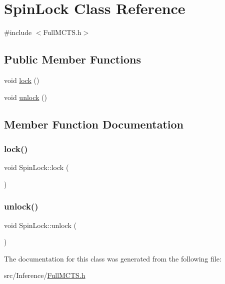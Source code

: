\hypertarget{class_spin_lock}{}\section{Spin\+Lock Class Reference}
\label{class_spin_lock}


{\ttfamily \#include $<$Full\+M\+C\+T\+S.\+h$>$}

\subsection*{Public Member Functions}
\begin{DoxyCompactItemize}
\item 
void \hyperlink{class_spin_lock_a2db046cb75c8febd532923ce36c4c3ad}{lock} ()
\item 
void \hyperlink{class_spin_lock_a25ef6814d1e3fbd621db947ae7522d0e}{unlock} ()
\end{DoxyCompactItemize}


\subsection{Member Function Documentation}
\mbox{\label{class_spin_lock_a2db046cb75c8febd532923ce36c4c3ad}} 
\subsubsection{\texorpdfstring{lock()}{lock()}}
{\footnotesize\ttfamily void Spin\+Lock\+::lock (\begin{DoxyParamCaption}{ }\end{DoxyParamCaption})\hspace{0.3cm}{\ttfamily [inline]}}

\mbox{\label{class_spin_lock_a25ef6814d1e3fbd621db947ae7522d0e}} 
\subsubsection{\texorpdfstring{unlock()}{unlock()}}
{\footnotesize\ttfamily void Spin\+Lock\+::unlock (\begin{DoxyParamCaption}{ }\end{DoxyParamCaption})\hspace{0.3cm}{\ttfamily [inline]}}



The documentation for this class was generated from the following file\+:\begin{DoxyCompactItemize}
\item 
src/\+Inference/\hyperlink{_full_m_c_t_s_8h}{Full\+M\+C\+T\+S.\+h}\end{DoxyCompactItemize}
